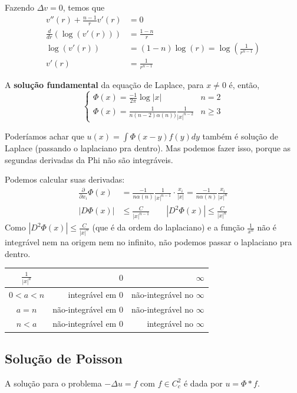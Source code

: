 \documentclass[11pt]{article}
\newcommand{\p}{\partial}
\newcommand{\pde}[2]{\frac{\p #1}{\p #2}}
\newcommand{\parentesis}[1]{\left(#1\right)}
\begin{document}
Fazendo \(\Delta v =0 \), temos que \begin{align*}
	v''(r) + \frac{n-1}{r}v'(r) &=0 \\
	\frac{d}{dr}\parentesis{\log (v'(r))} &= \frac{1-n}{r} \\
	\log (v'(r)) &= (1-n)\log(r)  = \log\left(\frac{1}{r^{n-1}}\right) \\
	v'(r) &= \frac{1}{r^{n-1}}
\end{align*}

A \textbf{solução fundamental} da equação de Laplace, para \(x\neq0\) é, então, \begin{equation*}
	\begin{cases}
		\Phi(x) = \frac{-1}{2\pi} \log |x|   &  n=2\\
		\Phi(x) = \frac{1}{n (n-2) \alpha(n))} \frac{1}{|x|^{n-2}} & n\geq3
	\end{cases}
\end{equation*}

Poderíamos achar que \(u(x) = \int \Phi(x-y)f(y)dy \) também é solução de Laplace (passando o laplaciano pra dentro). Mas podemos fazer isso, porque as segundas derivadas da Phi não são integráveis.

Podemos calcular suas derivadas:\begin{align*}
	\pde{}{x_i}\Phi(x) &= \frac{-1}{n \alpha(n)} \frac{1}{|x|^{n-1}} \cdot \frac{x_i}{|x|} = \frac{-1}{n \alpha(n)} \frac{x_i}{|x|^{n}}\\
	|D\Phi(x)| &\leq \frac{C}{|x|^{n-1}} \qquad |D^2\Phi(x)| \leq \frac{C}{|x|^{n}}
\end{align*}
Como \( | D^2 \Phi(x) | \leq \frac{C}{|x|^n} \) (que é da ordem do laplaciano) e a função \( \frac{1}{x^n} \) não é integrável nem na origem nem no infinito, não podemos passar o laplaciano pra dentro.

\begin{center}
	\begin{tabular}{ c | r  r}
	\(\frac{1}{|x|^a} \) & \(0\) & \(\infty\)    \\ \hline
	 \( 0 < a < n \)  &      integrável em 0 & não-integrável no \(\infty\) \\
	\( a = n \)       &     não-integrável em 0 & não-integrável no \(\infty\) \\
	\( n < a \)        &    não-integrável em 0 & integrável no \(\infty\) \\
\end{tabular}
\end{center}

\subsection{Solução de Poisson}
A solução para o problema \(-\Delta u =f\) com \(f \in C^2_c\) é dada por \(u = \Phi * f\). 
\end{document}
